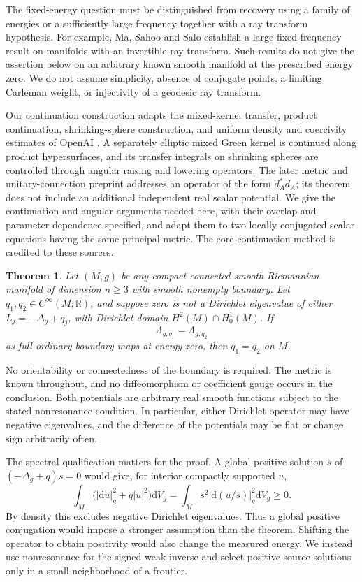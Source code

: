 \documentclass[11pt]{article}
\newtheorem{theorem}{Theorem}[section]
\theoremstyle{definition}\newtheorem{definition}[theorem]{Definition}
\theoremstyle{remark}\newtheorem{remark}[theorem]{Remark}
\newcommand{\dd}{\mathrm d}
\newcommand{\vol}{\dd V}
\begin{document}
The fixed-energy question must be distinguished from recovery using a
family of energies or a sufficiently large frequency together with a ray
transform hypothesis. For example, Ma, Sahoo and Salo
\cite{MaSahooSalo} establish a large-fixed-frequency result on manifolds
with an invertible ray transform. Such results do not give the assertion
below on an arbitrary known smooth manifold at the prescribed energy zero.
We do not assume simplicity, absence of conjugate points, a limiting
Carleman weight, or injectivity of a geodesic ray transform.

Our continuation construction adapts the mixed-kernel transfer, product
continuation, shrinking-sphere construction, and uniform density and
coercivity estimates of OpenAI \cite{OpenAIMetric}. A separately elliptic
mixed Green kernel is continued along product hypersurfaces, and its
transfer integrals on shrinking spheres are controlled through angular
raising and lowering operators. The later metric and unitary-connection preprint
\cite{OpenAIConnection} addresses an operator of the form $d_A^*d_A$;
its theorem does not include an additional independent real scalar
potential. We give the continuation and angular arguments needed here,
with their overlap and parameter dependence specified, and adapt them to
two locally conjugated scalar equations having the same principal metric.
The core continuation method is credited to these sources.

\begin{theorem}\label{thm:main}
Let $(M,g)$ be any compact connected smooth Riemannian manifold of
dimension $n\ge3$ with smooth nonempty boundary. Let
$q_1,q_2\in C^\infty(M;\mathbb R)$, and suppose zero is not a Dirichlet
eigenvalue of either $L_j=-\Delta_g+q_j$, with Dirichlet domain
$H^2(M)\cap H^1_0(M)$. If
\[
 \Lambda_{g,q_1}=\Lambda_{g,q_2}
\]
as full ordinary boundary maps at energy zero, then $q_1=q_2$ on $M$.
\end{theorem}

No orientability or connectedness of the boundary is required. The metric
is known throughout, and no diffeomorphism or coefficient gauge occurs in
the conclusion. Both potentials are arbitrary real smooth functions
subject to the stated nonresonance condition. In particular, either
Dirichlet operator may have negative eigenvalues, and the difference of
the potentials may be flat or change sign arbitrarily often.

The spectral qualification matters for the proof. A global positive
solution $s$ of $(-\Delta_g+q)s=0$ would give, for interior compactly
supported $u$,
\[
 \int_M\bigl(|\dd u|_g^2+q|u|^2\bigr)\vol_g
       =\int_M s^2|\dd(u/s)|_g^2\vol_g\ge0.
\]
By density this excludes negative Dirichlet eigenvalues. Thus a global
positive conjugation would impose a stronger assumption than the theorem.
Shifting the operator to obtain positivity would also change the measured
energy. We instead use nonresonance for the signed weak inverse and select
positive source solutions only in a small neighborhood of a frontier.
\end{document}
